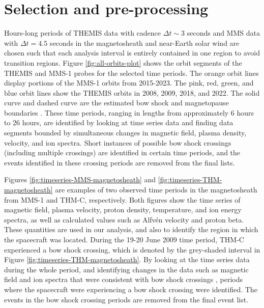 \section{Selection and pre-processing}
Hours-long periods of THEMIS data with cadence $\Delta t\sim$3 seconds and MMS data with $\Delta t=4.5$ seconds in the magnetosheath and near-Earth solar wind are chosen such that each analysis interval is entirely contained in one region to avoid transition regions. Figure \ref{fig:all-orbits-plot} shows the orbit segments of the THEMIS and MMS-1 probes for the selected time periods. The orange orbit lines display portions of the MMS-1 orbits from 2015-2023. The pink, red, green, and blue orbit lines show the THEMIS orbits in 2008, 2009, 2018, and 2022. The solid curve and dashed curve are the estimated bow shock and magnetopause boundaries \citep{SlavinHolzer:1984,Shue:1997}. These time periods, ranging in lengths from approximately 6 hours to 26 hours, are identified by looking at time series data and finding data segments bounded by simultaneous changes in magnetic field, plasma density, velocity, and ion spectra. Short instances of possible bow shock crossings (including multiple crossings) are identified in certain time periods, and the events identified in these crossing periods are removed from the final lists.

Figures \ref{fig:timeseries-MMS-magnetosheath} and \ref{fig:timeseries-THM-magnetosheath} are examples of two observed time periods in the magnetosheath from MMS-1 and THM-C, respectively. Both figures show the time series of magnetic field, plasma velocity, proton density, temperature, and ion energy spectra, as well as calculated values such as Alfv\'en velocity and proton beta. These quantities are used in our analysis, and also to identify the region in which the spacecraft was located. During the 19-20 June 2009 time period, THM-C experienced a bow shock crossing, which is denoted by the grey-shaded interval in Figure \ref{fig:timeseries-THM-magnetosheath}. By looking at the time series data during the whole period, and identifying changes in the data such as magnetic field and ion spectra that were consistent with bow shock crossings \citep{Lalti:2022,Trotta:2022}, periods where the spacecraft were experiencing a bow shock crossing were identified. The events in the bow shock crossing periods are removed from the final event list.

